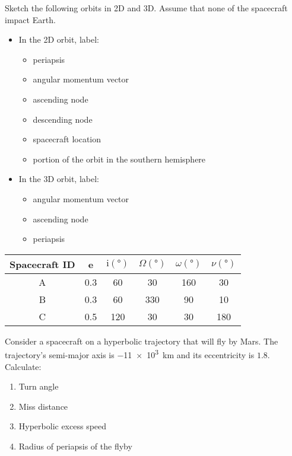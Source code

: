 \begin{hwkProblem}{4}{}
	Sketch the following orbits in 2D and 3D. Assume that none of the spacecraft impact Earth.
	\begin{itemize}
		\item In the 2D orbit, label:
		\begin{itemize}
			\item periapsis
			\item angular momentum vector
			\item ascending node
			\item descending node
			\item spacecraft location
			\item portion of the orbit in the southern hemisphere
		\end{itemize}
		\item In the 3D orbit, label:
		\begin{itemize}
			\item angular momentum vector
			\item ascending node
			\item periapsis
		\end{itemize}
	\end{itemize}
	\begin{center}
		\begin{tabular}{cccccc}
			\hline
			Spacecraft ID & e & \(\mathrm{i} \left( \unit{\degree} \right) \) & \(\Omega \left( \unit{\degree} \right)\) & \(\omega \left( \unit{\degree} \right)\) & \(\nu \left( \unit{\degree} \right)\) \\
			\hline
			\hline
			A & 0.3 & 60 & 30 & 160 & 30 \\
			\hline
			B & 0.3 & 60 & 330 & 90 & 10 \\
			\hline
			C & 0.5 & 120 & 30 & 30 & 180 \\
			\hline
		\end{tabular}
	\end{center}
	
	\hwkSol

\end{hwkProblem}
\begin{hwkProblem}{5}{}
	
	Consider a spacecraft on a hyperbolic trajectory that will fly by Mars. The trajectory's semi-major axis is \qty{-11e3}{\km} and its eccentricity is \( 1.8 \). Calculate:
	\begin{enumerate}
		\item Turn angle
		\item Miss distance
		\item Hyperbolic excess speed
		\item Radius of periapsis of the flyby
	\end{enumerate}
	
	\hwkSol

	
\end{hwkProblem}

